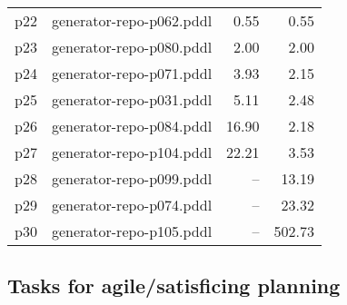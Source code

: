 \documentclass{article}
\begin{document}
\begin{center}
\begin{tabular}{@{}l|r|r|r@{}}
  p22& generator-repo-p062.pddl&0.55&0.55\\
  p23& generator-repo-p080.pddl&2.00&2.00\\
  p24& generator-repo-p071.pddl&3.93&2.15\\
  p25& generator-repo-p031.pddl&5.11&2.48\\
  p26& generator-repo-p084.pddl&16.90&2.18\\
  p27& generator-repo-p104.pddl&22.21&3.53\\
  p28& generator-repo-p099.pddl&--&13.19\\
  p29& generator-repo-p074.pddl&--&23.32\\
  p30& generator-repo-p105.pddl&--&502.73
                            \end{tabular}
                            \end{center}
                    

                    \subsection*{Tasks for agile/satisficing planning}
                    
\end{document}
